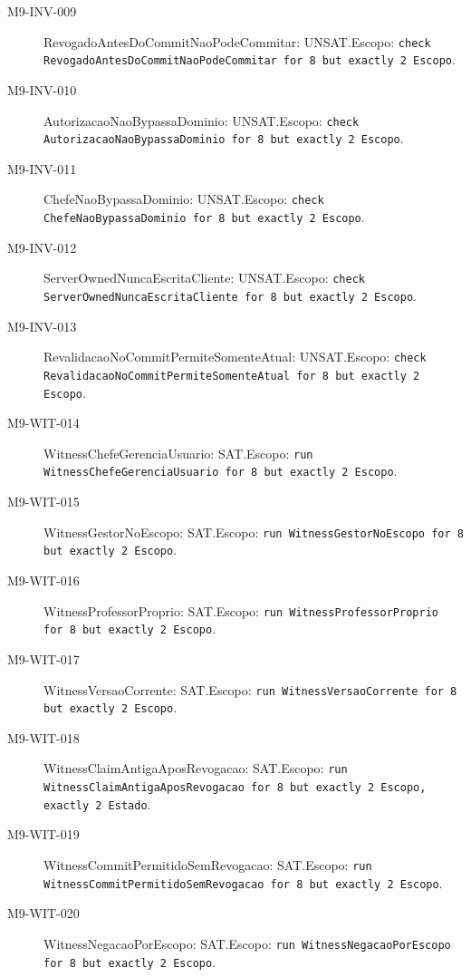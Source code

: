 \begin{description}
\item[M9-INV-009] RevogadoAntesDoCommitNaoPodeCommitar: UNSAT.\newline Escopo: \texttt{check RevogadoAntesDoCommitNaoPodeCommitar for 8 but exactly 2 Escopo}.
\item[M9-INV-010] AutorizacaoNaoBypassaDominio: UNSAT.\newline Escopo: \texttt{check AutorizacaoNaoBypassaDominio for 8 but exactly 2 Escopo}.
\item[M9-INV-011] ChefeNaoBypassaDominio: UNSAT.\newline Escopo: \texttt{check ChefeNaoBypassaDominio for 8 but exactly 2 Escopo}.
\item[M9-INV-012] ServerOwnedNuncaEscritaCliente: UNSAT.\newline Escopo: \texttt{check ServerOwnedNuncaEscritaCliente for 8 but exactly 2 Escopo}.
\item[M9-INV-013] RevalidacaoNoCommitPermiteSomenteAtual: UNSAT.\newline Escopo: \texttt{check RevalidacaoNoCommitPermiteSomenteAtual for 8 but exactly 2 Escopo}.
\item[M9-WIT-014] WitnessChefeGerenciaUsuario: SAT.\newline Escopo: \texttt{run WitnessChefeGerenciaUsuario for 8 but exactly 2 Escopo}.
\item[M9-WIT-015] WitnessGestorNoEscopo: SAT.\newline Escopo: \texttt{run WitnessGestorNoEscopo for 8 but exactly 2 Escopo}.
\item[M9-WIT-016] WitnessProfessorProprio: SAT.\newline Escopo: \texttt{run WitnessProfessorProprio for 8 but exactly 2 Escopo}.
\item[M9-WIT-017] WitnessVersaoCorrente: SAT.\newline Escopo: \texttt{run WitnessVersaoCorrente for 8 but exactly 2 Escopo}.
\item[M9-WIT-018] WitnessClaimAntigaAposRevogacao: SAT.\newline Escopo: \texttt{run WitnessClaimAntigaAposRevogacao for 8 but exactly 2 Escopo, exactly 2 Estado}.
\item[M9-WIT-019] WitnessCommitPermitidoSemRevogacao: SAT.\newline Escopo: \texttt{run WitnessCommitPermitidoSemRevogacao for 8 but exactly 2 Escopo}.
\item[M9-WIT-020] WitnessNegacaoPorEscopo: SAT.\newline Escopo: \texttt{run WitnessNegacaoPorEscopo for 8 but exactly 2 Escopo}.

\end{description}
